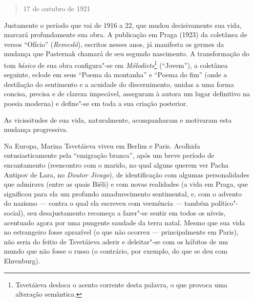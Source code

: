 {\begin{verse}
17 de outubro de 1921

\end{verse}

Justamente o período que vai de 1916 a 22, que mudou decisivamente sua
vida, marcará profundamente sua obra. A publicação em Praga (1923) da
coletânea de versos ``Ofício'' (\emph{Remesló}), escritos nesses anos, já
manifesta os germes da mudança que Pasternak chamará de seu segundo
nascimento. A transformação do tom \emph{básico} de sua obra
configura"-se em \emph{Mólodiets}\footnote{Tsvetáieva desloca o acento
  corrente desta palavra, o que provoca uma alteração semântica.}
(``Jovem''), a coletânea seguinte, eclode em seus ``Poema da montanha''
e ``Poema do fim'' (onde a destilação do sentimento e a acuidade do
discernimento, unidas a uma forma concisa, precisa e de clareza
impecável, asseguram à autora um lugar definitivo na poesia moderna) e
define"-se em toda a sua criação posterior.

As vicissitudes de sua vida, naturalmente, acompanharam e motivaram esta
mudança progressiva.

Na Europa, Marina Tsvetáieva viveu em Berlim e Paris. Acolhida
entusiasticamente pela ``emigração branca'', após um breve período de
encantamento (reencontro com o marido, no qual alguns querem ver Pacha
Antipov de Lara, no \emph{Doutor Jivago}), de identificação com algumas
personalidades que admirava (entre as quais Biéli) e com novas
realidades (a vida em Praga, que significou para ela um profundo
amadurecimento sentimental, e, com o advento do nazismo --- contra o qual
ela escreveu com veemência --- também político"-social), seu
desajustamento recomeça a fazer"-se sentir em todos os níveis, acentuado
agora por uma pungente saudade da terra natal. Mesmo que sua vida no
estrangeiro fosse aprazível (o que não ocorreu --- principalmente em
Paris), não seria do feitio de Tsvetáieva aderir e deleitar"-se com os
hábitos de um mundo que não fosse o russo (o contrário, por exemplo, do
que se deu com Ehrenburg).

}
